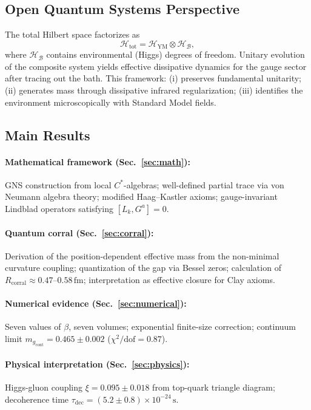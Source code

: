 \documentclass[aps,prd,reprint,superscriptaddress,floatfix]{revtex4-2}
\theoremstyle{definition}
\newcommand{\fm}{\,\mathrm{fm}}
\newcommand{\YM}{\mathrm{YM}}
\newcommand{\bath}{\mathcal{B}}
\newcommand{\hilb}{\mathscr{H}}
\newcommand{\cont}{_{\mathrm{cont}}}
\newcommand{\corr}{_{\mathrm{corral}}}
\begin{document}
\subsection{Open Quantum Systems Perspective}

The total Hilbert space factorizes as
\begin{equation}
  \hilb_{\mathrm{tot}} = \hilb_\YM \otimes \hilb_\bath,
  \label{eq:hilbert_fact}
\end{equation}
where $\hilb_\bath$ contains environmental (Higgs) degrees of freedom.
Unitary evolution of the composite system yields effective dissipative
dynamics for the gauge sector after tracing out the bath. This framework:
(i) preserves fundamental unitarity; (ii) generates mass through
dissipative infrared regularization; (iii) identifies the environment
microscopically with Standard Model fields.

\subsection{Main Results}

\paragraph{Mathematical framework (Sec.~\ref{sec:math}):}
GNS construction from local $C^*$-algebras; well-defined partial trace via
von Neumann algebra theory; modified Haag--Kastler axioms; gauge-invariant
Lindblad operators satisfying $[L_k,G^a]=0$.

\paragraph{Quantum corral (Sec.~\ref{sec:corral}):}
Derivation of the position-dependent effective mass from the non-minimal
curvature coupling; quantization of the gap via Bessel zeros; calculation
of $R\corr\approx 0.47$--$0.58\fm$; interpretation as effective closure
for Clay axioms.

\paragraph{Numerical evidence (Sec.~\ref{sec:numerical}):}
Seven values of $\beta$, seven volumes; exponential finite-size correction;
continuum limit $m_g\cont=0.465\pm 0.002$ ($\chi^2/\mathrm{dof}=0.87$).

\paragraph{Physical interpretation (Sec.~\ref{sec:physics}):}
Higgs-gluon coupling $\xi=0.095\pm 0.018$ from top-quark triangle diagram;
decoherence time $\tau_{\mathrm{dec}}=(5.2\pm 0.8)\times 10^{-24}\,\mathrm{s}$.
\end{document}
